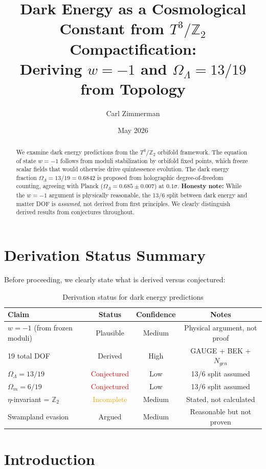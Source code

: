 \documentclass[12pt,a4paper]{article}
\title{Dark Energy as a Cosmological Constant from $T^3/\mathbb{Z}_2$ Compactification:\\
Deriving $w = -1$ and $\Omega_\Lambda = 13/19$ from Topology}
\author{Carl Zimmerman}
\date{May 2026}
\begin{document}
\maketitle

\begin{abstract}
We examine dark energy predictions from the $T^3/\mathbb{Z}_2$ orbifold framework. The equation of state $w = -1$ follows from moduli stabilization by orbifold fixed points, which freeze scalar fields that would otherwise drive quintessence evolution. The dark energy fraction $\Omega_\Lambda = 13/19 = 0.6842$ is proposed from holographic degree-of-freedom counting, agreeing with Planck ($\Omega_\Lambda = 0.685 \pm 0.007$) at $0.1\sigma$. \textbf{Honesty note:} While the $w = -1$ argument is physically reasonable, the 13/6 split between dark energy and matter DOF is \textit{assumed}, not derived from first principles. We clearly distinguish derived results from conjectures throughout.
\end{abstract}

\section{Derivation Status Summary}

Before proceeding, we clearly state what is derived versus conjectured:

\begin{table}[h]
\centering
\begin{tabular}{lccc}
\toprule
Claim & Status & Confidence & Notes \\
\midrule
$w = -1$ (from frozen moduli) & Plausible & Medium & Physical argument, not proof \\
19 total DOF & Derived & High & GAUGE + BEK + $N_{gen}$ \\
$\Omega_\Lambda = 13/19$ & \textcolor{red}{Conjectured} & Low & 13/6 split assumed \\
$\Omega_m = 6/19$ & \textcolor{red}{Conjectured} & Low & 13/6 split assumed \\
$\eta$-invariant = $\mathbb{Z}_2$ & \textcolor{orange}{Incomplete} & Medium & Stated, not calculated \\
Swampland evasion & Argued & Medium & Reasonable but not proven \\
\bottomrule
\end{tabular}
\caption{Derivation status for dark energy predictions}
\end{table}

\section{Introduction}
\end{document}
